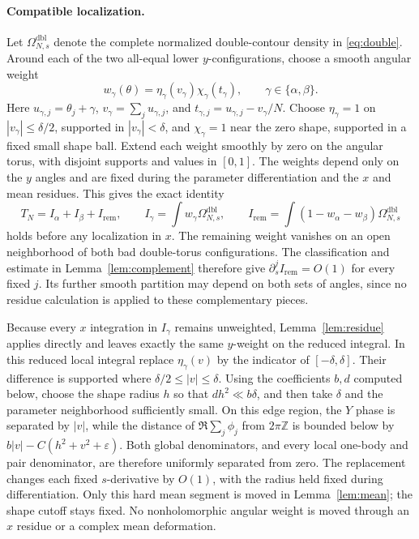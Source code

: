 \documentclass[11pt]{article}
\numberwithin{equation}{section}
\theoremstyle{definition}
\newcommand{\Z}{\mathbb Z}
\newcommand{\eps}{\varepsilon}
\begin{document}
\paragraph{Compatible localization.}
Let \(\Omega^{\mathrm{dbl}}_{N,s}\) denote the complete normalized
double-contour density in \eqref{eq:double}. Around each of the two
all-equal lower \(y\)-configurations, choose a smooth angular weight
\[
 w_\gamma(\theta)=\eta_\gamma(v_\gamma)\chi_\gamma(t_\gamma),
 \qquad \gamma\in\{\alpha,\beta\}.
\]
Here \(u_{\gamma,j}=\theta_j+\gamma\),
\(v_\gamma=\sum_j u_{\gamma,j}\), and
\(t_{\gamma,j}=u_{\gamma,j}-v_\gamma/N\).
Choose \(\eta_\gamma=1\) on \(|v_\gamma|\le\delta/2\), supported
in \(|v_\gamma|<\delta\), and \(\chi_\gamma=1\) near the zero shape,
supported in a fixed small shape ball. Extend each weight smoothly by
zero on the angular torus, with disjoint supports and values in \([0,1]\).
The weights depend only on the \(y\) angles and are fixed during
the parameter differentiation and the \(x\) and mean residues.
This gives the exact identity
\[
 T_N=I_\alpha+I_\beta+I_{\mathrm{rem}},\qquad
 I_\gamma=\int w_\gamma\Omega^{\mathrm{dbl}}_{N,s},\qquad
 I_{\mathrm{rem}}=\int(1-w_\alpha-w_\beta)
                         \Omega^{\mathrm{dbl}}_{N,s}
\]
holds before any localization in \(x\).
The remaining weight vanishes on an open neighborhood of both bad
double-torus configurations. The classification and estimate in
Lemma~\ref{lem:complement} therefore give
\(\partial_s^j I_{\mathrm{rem}}=O(1)\) for every fixed \(j\).
Its further smooth partition may depend on both sets of angles,
since no residue calculation is applied to these complementary pieces.

Because every \(x\) integration in \(I_\gamma\) remains unweighted,
Lemma~\ref{lem:residue} applies directly and leaves exactly the same
\(y\)-weight on the reduced integral. In this reduced local integral replace
\(\eta_\gamma(v)\) by the indicator of \([-\delta,\delta]\).
Their difference is supported where \(\delta/2\le |v|\le\delta\).
Using the coefficients \(b,d\) computed below, choose the shape radius
\(h\) so that \(dh^2\ll b\delta\), and then take \(\delta\) and
the parameter neighborhood sufficiently small. On this edge region,
the \(Y\) phase is separated by \(|v|\), while the distance of
\(\Re\sum_j\phi_j\) from \(2\pi\Z\) is bounded below by
\(b|v|-C(h^2+v^2+\eps)\). Both global denominators, and every local
one-body and pair denominator, are therefore uniformly separated
from zero. The replacement changes each fixed \(s\)-derivative by
\(O(1)\), with the radius held fixed during differentiation.
Only this hard mean segment is moved in Lemma~\ref{lem:mean}; the
shape cutoff stays fixed. No nonholomorphic angular weight is moved
through an \(x\) residue or a complex mean deformation.
\end{document}

